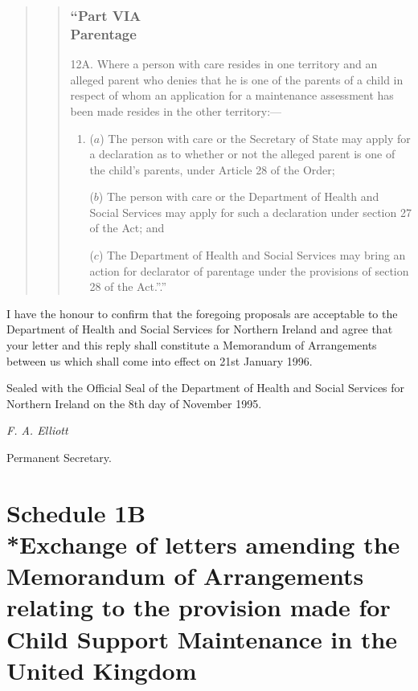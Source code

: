 \documentclass[12pt,a4paper]{article}
\begin{document}
\begin{quotation}
\begin{quotation}
 \section*{“Part VIA\\Parentage}

12A.  Where a person with care resides in one territory and an alleged parent who denies that he is one of the parents of a child in respect of whom an application for a maintenance assessment has been made resides in the other territory:—
\begin{enumerate}\item[]
\begin{sloppypar}
($a$) The person with care or the Secretary of State may apply for a declaration as to whether or not the alleged parent is one of the child’s parents, under Article 28 of the Order;
\end{sloppypar}

($b$) The person with care or the Department of Health and Social Services may apply for such a declaration under section 27 of the Act; and

($c$) The Department of Health and Social Services may bring an action for declarator of parentage under the provisions of section 28 of the Act.”.”
\end{enumerate}
\end{quotation}
\end{quotation}

  I have the honour to confirm that the foregoing proposals are acceptable to the Department of Health and Social Services for Northern Ireland and agree that your letter and this reply shall constitute a Memorandum of Arrangements between us which shall come into effect on 21st January 1996.

  Sealed with the Official Seal of the Department of Health and Social Services for Northern Ireland on the 8th day of November 1995.

  \emph{F. A. Elliott}

  Permanent Secretary.

\part[Schedule 1B --- Exchange of letters amending the Memorandum of Arrangements relating to the provision made for Child Support Maintenance in the United Kingdom]{Schedule 1B\\*Exchange of letters amending the Memorandum of Arrangements relating to the provision made for Child Support Maintenance in the United Kingdom}
\end{document}
